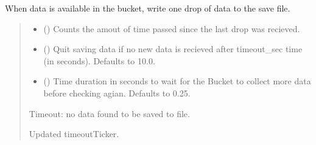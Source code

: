 \documentclass[letterpaper,10pt,english]{sphinxmanual}
\begin{document}
\begin{fulllineitems}
\begin{fulllineitems}
\label{\detokenize{Morelia.Stream.Collect:Morelia.Stream.Collect.DrainBucketToFile.DrainBucket._DrainDropToFile}}
\pysigstartsignatures
{}
\pysigstopsignatures
\sphinxAtStartPar
When data is available in the bucket, write one drop of data to the save file.
\begin{quote}\begin{description}
\begin{itemize}
\item {} 
\sphinxAtStartPar
{} () \textendash{} Counts the amout of time passed since the last drop was recieved.

\item {} 
\sphinxAtStartPar
{} (\sphinxstyleliteralemphasis{\sphinxupquote{, }}) \textendash{} Quit saving data if no new data is recieved                 after timeout\_sec time (in seconds). Defaults to 10.0.

\item {} 
\sphinxAtStartPar
{} (\sphinxstyleliteralemphasis{\sphinxupquote{, }}) \textendash{} Time duration in seconds to wait for the Bucket to                 collect more data before checking agian. Defaults to 0.25.

\end{itemize}

\sphinxAtStartPar
{} \textendash{} Timeout: no data found to be saved to file.

\sphinxAtStartPar
Updated timeoutTicker.


\end{description}
\end{quote}
\end{fulllineitems}
\end{fulllineitems}
\end{document}
